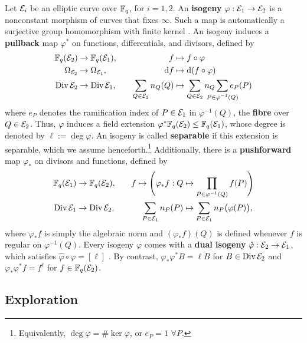 \documentclass[twocolumn, 11pt]{scrartcl}
\begin{document}
Let $\mcE_i$ be an elliptic curve over $\bbF_q$, for $i=1,2$. An \textbf{isogeny} $\varphi:\mcE_1\to\mcE_2$ is a nonconstant morphism of curves that fixes $\infty$. Such a map is automatically a surjective group homomorphism with finite kernel \cite[\S III.4]{silverman2009arithmetic}. An isogeny induces a \textbf{pullback} map $\varphi^*$ on functions, differentials, and divisors, defined by
\begin{alignat*}{2}
    \bbF_q(\mcE_2)&\to\bbF_q(\mcE_1), & \quad f &\mapsto f\circ\varphi \\
    \Omega_{\mcE_2}&\to\Omega_{\mcE_1}, & \quad \df &\mapsto \dx[(f\circ\varphi)] \\
    \Div\mcE_2&\to\Div\mcE_1, & \quad \sum_{Q\in\mcE_2} n_Q(Q) &\mapsto \sum_{Q\in\mcE_2} n_Q \sum_{\mathclap{P\in\varphi^{-1}(Q)}} e_P(P)
\end{alignat*}
where $e_P$ denotes the ramification index of $P\in\mcE_1$ in $\varphi^{-1}(Q)$, the \textbf{fibre} over $Q\in\mcE_2$. Thus, $\varphi$ induces a field extension $\varphi^*\bbF_q(\mcE_2)\leq\bbF_q(\mcE_1)$, whose degree is denoted by $\ell:=\deg\varphi$. An isogeny is called \textbf{separable} if this extension is separable, which we assume henceforth.\footnote{Equivalently, $\deg\varphi=\#\ker\varphi$, or $e_P=1$ $\forall P$.} Additionally, there is a \textbf{pushforward} map $\varphi_*$ on divisors and functions, defined by
\begin{alignat*}{2}
    \bbF_q(\mcE_1)&\to\bbF_q(\mcE_2), & \quad f \mapsto \pa[\Bigg]{\varphi_*f:Q&\mapsto\prod_{P\in\varphi^{-1}(Q)}f(P)} \\
    \Div\mcE_1&\to\Div\mcE_2, & \quad \sum_{P\in\mcE_1} n_P(P) &\mapsto \sum_{P\in\mcE_1} n_P\pa[\big]{\varphi(P)},
\end{alignat*}
where $\varphi_*f$ is simply the algebraic norm and $(\varphi_*f)(Q)$ is defined whenever $f$ is regular on $\varphi^{-1}(Q)$. Every isogeny $\varphi$ comes with a \textbf{dual isogeny} $\hat\varphi:\mcE_2\to\mcE_1$, which satisfies $\hat\varphi\circ\varphi=[\ell]$ \cite[\S III.6]{silverman2009arithmetic}. By contrast, $\varphi_*\varphi^*B=\ell B$ for $B\in\Div\mcE_2$ and $\varphi_*\varphi^*f=f^\ell$ for $f\in\bbF_q(\mcE_2)$.

\subsection{Exploration} \label{subsection:exploration}
\end{document}
